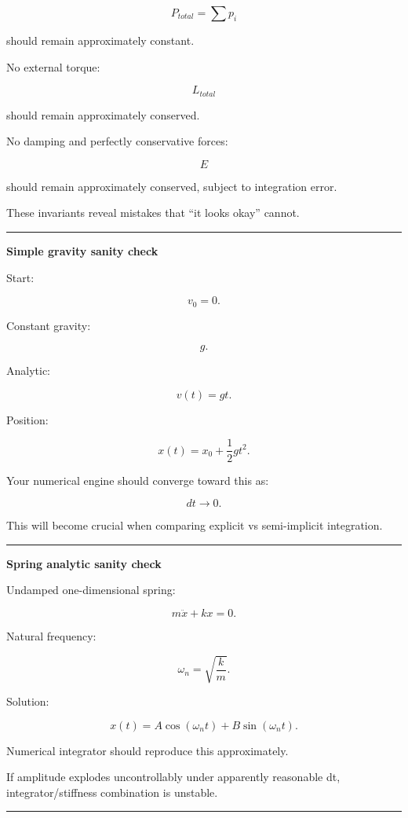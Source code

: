 \[
P_{total}
=
\sum p_i
\]

should remain approximately constant.

No external torque:

\[
L_{total}
\]

should remain approximately conserved.

No damping and perfectly conservative forces:

\[
E
\]

should remain approximately conserved, subject to integration error.

These invariants reveal mistakes that ``it looks okay'' cannot.

\begin{center}\rule{0.5\linewidth}{0.5pt}\end{center}

\textbf{Simple gravity sanity check}

Start:

\[
v_0=0.
\]

Constant gravity:

\[
g.
\]

Analytic:

\[
v(t)=gt.
\]

Position:

\[
x(t)
=
x_0+
\frac12gt^2.
\]

Your numerical engine should converge toward this as:

\[
dt\rightarrow0.
\]

This will become crucial when comparing explicit vs semi-implicit integration.

\begin{center}\rule{0.5\linewidth}{0.5pt}\end{center}

\textbf{Spring analytic sanity check}

Undamped one-dimensional spring:

\[
m\ddot x+kx=0.
\]

Natural frequency:

\[
\omega_n=
\sqrt{\frac{k}{m}}.
\]

Solution:

\[
x(t)
=
A\cos(\omega_nt)
+
B\sin(\omega_nt).
\]

Numerical integrator should reproduce this approximately.

If amplitude explodes uncontrollably under apparently reasonable dt, integrator/stiffness combination is unstable.

\begin{center}\rule{0.5\linewidth}{0.5pt}\end{center}

